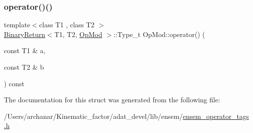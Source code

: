 \mbox{\label{structOpMod_a76039bd668de4b56b48f8d9c64bebce4}} 
\subsubsection{\texorpdfstring{operator()()}{operator()()}\hspace{0.1cm}{\footnotesize\ttfamily [2/2]}}
{\footnotesize\ttfamily template$<$class T1 , class T2 $>$ \\
\mbox{\hyperlink{structBinaryReturn}{Binary\+Return}}$<$T1, T2, \mbox{\hyperlink{structOpMod}{Op\+Mod}} $>$\+::Type\+\_\+t Op\+Mod\+::operator() (\begin{DoxyParamCaption}\item[{const T1 \&}]{a,  }\item[{const T2 \&}]{b }\end{DoxyParamCaption}) const\hspace{0.3cm}{\ttfamily [inline]}}



The documentation for this struct was generated from the following file\+:\begin{DoxyCompactItemize}
\item 
/\+Users/archanar/\+Kinematic\+\_\+factor/adat\+\_\+devel/lib/ensem/\mbox{\hyperlink{lib_2ensem_2ensem__operator__tags_8h}{ensem\+\_\+operator\+\_\+tags.\+h}}\end{DoxyCompactItemize}
